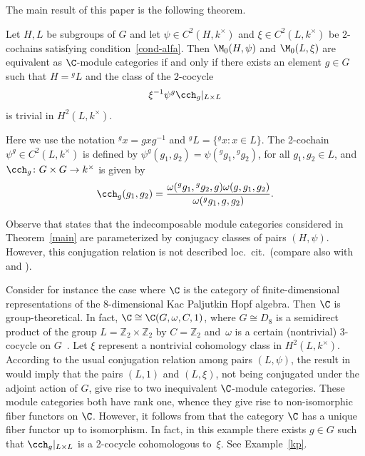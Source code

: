 The main result of this paper is the following theorem.

\begin{Theorem}\label{main} Let $H, L$ be subgroups of $G$ and let $\psi \in C^2(H, k^{\times})$ and $\xi \in C^2(L, k^{\times})$ be $2$-cochains satisfying condition~\eqref{cond-alfa}. Then $\M_0(H, \psi)$ and $\M_0(L, \xi)$ are equivalent as $\C$-module categories if and only if there exists an element $g \in G$ such that $H = {}^gL$ and the class of the $2$-cocycle
\begin{gather}\label{cond-equiv} {\xi}^{-1}{\psi}^g \cch_g\vert_{L\times L}
\end{gather}
is trivial in $H^2(L, k^{\times})$.
\end{Theorem}

Here we use the notation ${}^g x = gxg^{-1}$ and $^gL = \{{}^g x\colon x\in L\}$. The 2-cochain ${\psi}^g \in C^2(L, k^{\times})$ is def\/ined by ${\psi}^g(g_1, g_2) = {\psi}({}^gg_1, {}^gg_2)$, for all $g_1, g_2 \in L$, and $\cch_g\colon G \times G \to k^{\times}$ is given by
\begin{gather*}\cch_g(g_1, g_2) = \frac{\omega({}^gg_1, {}^gg_2, g) \omega(g, g_1, g_2)}{\omega({}^gg_1, g, g_2)}.
\end{gather*}

Observe that \cite[Theorem 3.1]{ostrik} states that the indecomposable module categories considered in Theorem~\ref{main} are parameterized by conjugacy classes of pairs $(H, \psi)$. However, this conjugation relation is not described loc.\ cit.\ (compare also with \cite{nikshych} and \cite[Section~9.7]{egno}).

 Consider for instance the case where $\C$ is the category of f\/inite-dimensional representations of the 8-dimensional Kac Paljutkin Hopf algebra. Then $\C$ is group-theoretical. In fact, $\C \cong \C(G, \omega, C, 1)$, where $G \cong D_8$ is a semidirect product of the group $L = \mathbb Z_2 \times \mathbb Z_2$ by $C = \mathbb Z_2$ and~$\omega$ is a certain (nontrivial) 3-cocycle on $G$~\cite{schauenburg}. Let $\xi$ represent a nontrivial cohomology class in $H^2(L, k^\times)$. According to the usual conjugation relation among pairs $(L, \psi)$, the result in \cite[Theorem~3.1]{ostrik} would imply that the pairs $(L, 1)$ and $(L, \xi)$, not being conjugated under the adjoint action of $G$, give rise to two inequivalent $\C$-module categories. These module categories both have rank one, whence they give rise to non-isomorphic f\/iber functors on $\C$. However, it follows from \cite[Theorem~4.8(1)]{ma-contemp} that the category $\C$ has a unique f\/iber functor up to isomorphism. In fact, in this example there exists $g \in G$ such that $\cch_g\vert_{L\times L}$ is a 2-cocycle cohomologous to~$\xi$. See Example~\ref{kp}.

